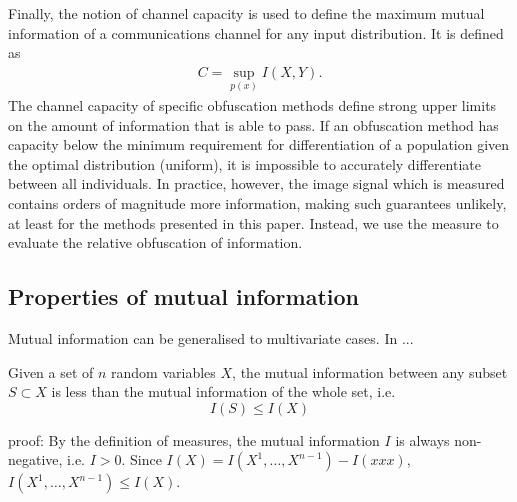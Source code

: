 
Finally, the notion of channel capacity is used to define the maximum mutual information of a communications channel for any input distribution. It is defined as
\begin{align}
    C = \sup_{p(x)} I(X, Y).
\end{align}
The channel capacity of specific obfuscation methods define strong upper limits on the amount of information that is able to pass. If an obfuscation method has capacity below the minimum requirement for differentiation of a population given the optimal distribution (uniform), it is impossible to accurately differentiate between all individuals. In practice, however, the image signal which is measured contains orders of magnitude more information, making such guarantees unlikely, at least for the methods presented in this paper. Instead, we use the measure to evaluate the relative obfuscation of information.

\subsection{Properties of mutual information}
Mutual information can be generalised to multivariate cases. In ...

\begin{definition}
Given a set of $n$ random variables $X$, the mutual information between any subset $S\subset X$ is less than the mutual information of the whole set, i.e.
\begin{equation}
     I(S) \leq I(X)
\end{equation}
\end{definition}

proof: By the definition of measures, the mutual information $I$ is always non-negative, i.e. $I > 0$. Since $I(X) = I(X^1, \dots, X^{n-1}) - I(xxx)$, $I(X^1, \dots, X^{n-1}) \leq I(X)$.

